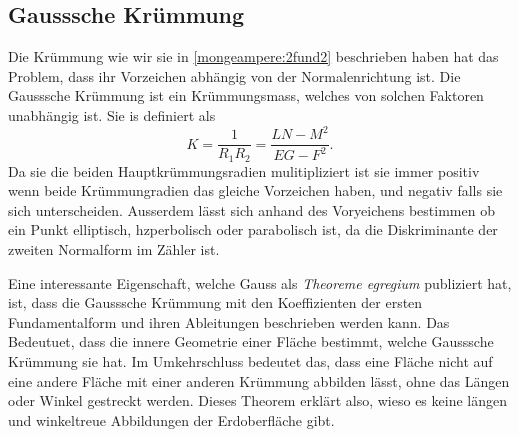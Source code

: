 \subsection{Gausssche Krümmung}
Die Krümmung wie wir sie in \eqref{mongeampere:2fund2} beschrieben haben hat das Problem, dass
ihr Vorzeichen abhängig von der Normalenrichtung ist.
Die Gausssche Krümmung ist ein Krümmungsmass, welches von solchen Faktoren unabhängig ist.
Sie is definiert als 
\begin{equation}
  K = \frac{1}{R_1 R_2} = \frac{LN-M^2}{EG-F^2}.
  \label{mongeampere:gausskrumm}
\end{equation}
Da sie die beiden Hauptkrümmungsradien mulitipliziert ist sie immer positiv wenn 
beide Krümmungradien das gleiche Vorzeichen haben, und negativ falls sie sich unterscheiden.
Ausserdem lässt sich anhand des Voryeichens bestimmen ob ein Punkt elliptisch, hzperbolisch oder parabolisch 
ist, da die Diskriminante der zweiten Normalform im Zähler ist.

Eine interessante Eigenschaft, welche Gauss als \emph{Theoreme egregium} publiziert hat, ist, dass
die Gausssche Krümmung mit den Koeffizienten der ersten Fundamentalform und ihren Ableitungen beschrieben werden kann.
Das Bedeutuet, dass die innere Geometrie einer Fläche bestimmt, welche Gausssche Krümmung sie hat.
Im Umkehrschluss bedeutet das, dass eine Fläche nicht auf eine andere Fläche mit einer anderen Krümmung abbilden
lässt, ohne das Längen oder Winkel gestreckt werden.
Dieses Theorem erklärt also, wieso es keine längen und winkeltreue Abbildungen der Erdoberfläche gibt.

